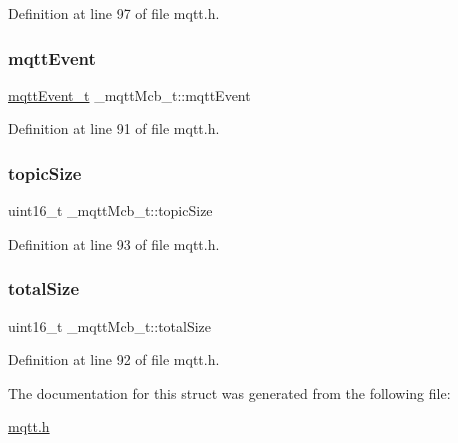 Definition at line 97 of file mqtt.\+h.

\mbox{\label{struct__mqttMcb__t_a2444e1da64e107ac3e38c67ca5c5bbed}} 
\subsubsection{\texorpdfstring{mqtt\+Event}{mqttEvent}}
{\footnotesize\ttfamily \hyperlink{mqtt_8h_addc2504b9e66d98288c510964264c855}{mqtt\+Event\+\_\+t} \+\_\+mqtt\+Mcb\+\_\+t\+::mqtt\+Event}



Definition at line 91 of file mqtt.\+h.

\mbox{\label{struct__mqttMcb__t_adb2a22865e9366348daa11bad69f3a1e}} 
\subsubsection{\texorpdfstring{topic\+Size}{topicSize}}
{\footnotesize\ttfamily uint16\+\_\+t \+\_\+mqtt\+Mcb\+\_\+t\+::topic\+Size}



Definition at line 93 of file mqtt.\+h.

\mbox{\label{struct__mqttMcb__t_a200ee8c05ebb39e64b7b66b7710dce0f}} 
\subsubsection{\texorpdfstring{total\+Size}{totalSize}}
{\footnotesize\ttfamily uint16\+\_\+t \+\_\+mqtt\+Mcb\+\_\+t\+::total\+Size}



Definition at line 92 of file mqtt.\+h.



The documentation for this struct was generated from the following file\+:\begin{DoxyCompactItemize}
\item 
\hyperlink{mqtt_8h}{mqtt.\+h}\end{DoxyCompactItemize}
